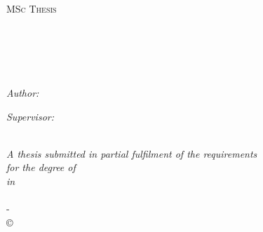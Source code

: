 \begin{titlepage}
\begin{center}

\textsc{\LARGE \univname}\\[1.5cm] %
\textsc{\Large MSc Thesis}\\[0.5cm] %

\HRule \\[0.4cm] %
\begin{doublespacing}
	{\huge \bfseries \thesistitle}\\[0.4cm] %
\end{doublespacing}
\HRule \\[1.5cm] %
 
\begin{minipage}{0.4\textwidth}
\begin{flushleft} \large
\emph{Author:}\\
\authorname %
\end{flushleft}
\end{minipage}
\begin{minipage}{0.4\textwidth}
\begin{flushright} \large
\emph{Supervisor:} \\
\committeechair %
\end{flushright}
\end{minipage}\\[2cm]
 
\large \textit{A thesis submitted in partial fulfilment of the requirements\\ for the degree of \degreename}\\[0.3cm] %
\textit{in}\\[0.4cm]
\degreefield\\[1.8cm] %

 
{\large \degreemonth - \degreeyear}\\[1.8cm] %

{\copyright} {\degreeyear} \authorname
 
\vfill
\end{center}

\end{titlepage}